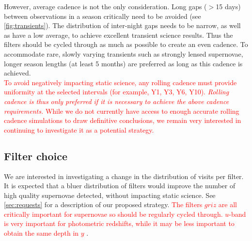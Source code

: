 \documentclass[12pt, letterpaper]{article}
\newcommand{\review}[1]{{\textcolor{red}{#1}}}
\begin{document}
\noindent
However, average cadence is not the only consideration. Long gaps ($>$15 days) between observations in a season critically need to be avoided (see \autoref{fig:transients}). The distribution of inter-night gaps needs to be narrow, as well as have a low average, to achieve excellent transient science results. Thus the filters should be cycled through as much as possible to create an even cadence. To accommodate rare, slowly varying transients such as strongly lensed supernovae, longer season lengths (at least 5 months) are preferred as long as this cadence is achieved.\\ 

\noindent
\review{To avoid negatively impacting static science, any rolling cadence must provide uniformity at the selected intervals (for example, Y1, Y3, Y6, Y10). \emph{Rolling cadence is thus only preferred if it is necessary to achieve the above cadence requirements.} While we do not currently have access to enough accurate rolling cadence simulations to draw definitive conclusions, we remain very interested in continuing to investigate it as a potential strategy.}

\subsection{Filter choice}
\label{sec:filters}
We are interested in investigating a change in the distribution of visits per filter. It is expected that a bluer distribution of filters would improve the number of high quality supernovae detected, without impacting static science. See \autoref{sec:requests} for a description of our proposed strategy. \review{The filters $griz$ are all critically important for supernovae so should be regularly cycled through. $u$-band is very important for photometric redshifts, while it may be less important to obtain the same depth in $y$ \cite{graham2017}}.
\end{document}
